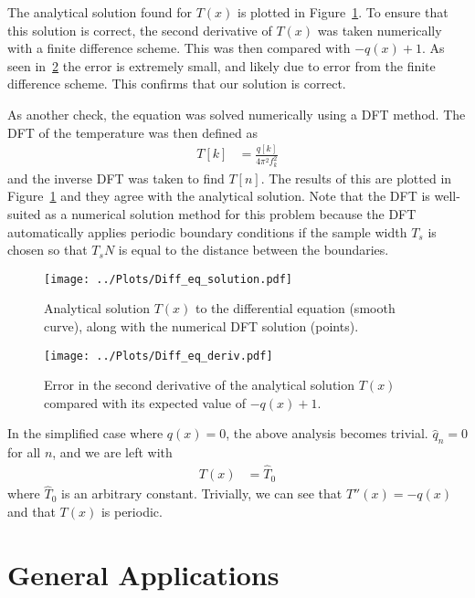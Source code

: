 \documentclass[twocolumn]{myarticle}
\begin{document}
The analytical solution found for $ T(x) $ is plotted in Figure~\ref{fig:diff_eq_solution}.
To ensure that this solution is correct, the second derivative of $ T(x) $ was taken numerically with a finite difference scheme.
This was then compared with $ -q(x)+1 $.
As seen in~\ref{fig:diff_eq_deriv} the error is extremely small, and likely due to error from the finite difference scheme.
This confirms that our solution is correct.

As another check, the equation was solved numerically using a DFT method.
The DFT of the temperature was then defined as
\begin{align}
    T[k] &= \frac{q[k]}{4 \pi^2 f_k^2}
\end{align}
and the inverse DFT was taken to find $ T[n] $.
The results of this are plotted in Figure~\ref{fig:diff_eq_solution} and they agree with the analytical solution.
Note that the DFT is well-suited as a numerical solution method for this problem because the DFT automatically applies periodic boundary conditions if the sample width $ T_s $ is chosen so that $ T_s N $ is equal to the distance between the boundaries.

\begin{figure}[ht]
    \centering
    \texttt{[image: ../Plots/Diff\_eq\_solution.pdf]}
    \caption{Analytical solution $ T(x) $ to the differential equation (smooth curve), along with the numerical DFT solution (points).}
    \label{fig:diff_eq_solution}
\end{figure}

\begin{figure}[ht]
    \centering
    \texttt{[image: ../Plots/Diff\_eq\_deriv.pdf]}
    \caption{Error in the second derivative of the analytical solution $ T(x) $ compared with its expected value of $ -q(x) + 1 $.}
    \label{fig:diff_eq_deriv}
\end{figure}

In the simplified case where $ q(x) = 0 $, the above analysis becomes trivial.
$ \hat{q}_n = 0 $ for all $ n $, and we are left with
\begin{align}
    T(x) &= \hat{T}_0
\end{align}
where $ \hat{T}_0 $ is an arbitrary constant.
Trivially, we can see that $ T''(x) = -q(x) $ and that $ T(x) $ is periodic.

\section{General Applications}
\end{document}
